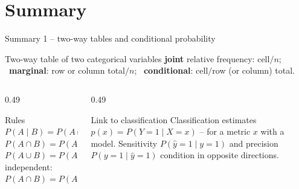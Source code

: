 \documentclass[aspectratio=169,11pt]{beamer}
\begin{document}
\section{Summary}

\begin{frame}{Summary 1 -- two-way tables and conditional probability}
  \begin{block}{Two-way table of two categorical variables}
    \textbf{joint} relative frequency: cell$/n$; \ \textbf{marginal}: row or
    column total$/n$; \ \textbf{conditional}: cell$/$row (or column) total.
  \end{block}
  \begin{columns}[T]
    \begin{column}{0.49\textwidth}
      \begin{block}{Rules}
        $P(A\mid B)=P(A\cap B)/P(B)$\\[2pt]
        $P(A\cap B)=P(A\mid B)\,P(B)=P(B\mid A)\,P(A)$\\[2pt]
        $P(A\cup B)=P(A)+P(B)-P(A\cap B)$\\[2pt]
        independent: $P(A\cap B)=P(A)\,P(B)\Leftrightarrow P(A\mid B)=P(A)$
      \end{block}
    \end{column}
    \begin{column}{0.49\textwidth}
      \begin{block}{Link to classification}
        Classification estimates $p(x)=P(Y=1\mid X=x)$ -- for a metric $x$
        with a model. Sensitivity $P(\hat y=1\mid y=1)$ and precision
        $P(y=1\mid\hat y=1)$ condition in opposite directions.
      \end{block}
    \end{column}
  \end{columns}
\end{frame}
\end{document}
